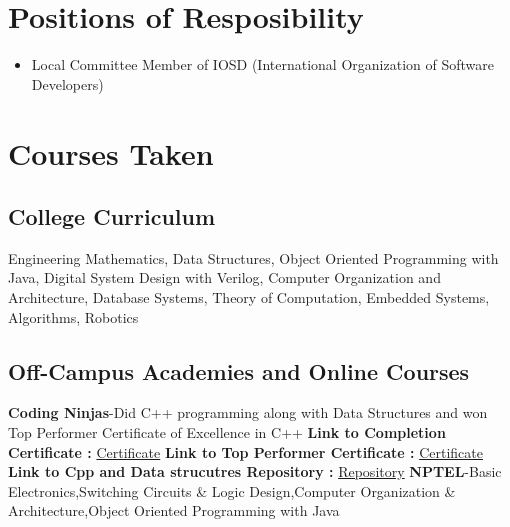 \documentclass[a4paper,12pt]{article}
\begin{document}
\section*{Positions of Resposibility}
\begin{itemize}
    \item Local Committee Member of IOSD
          (International Organization of Software Developers)
\end{itemize}
\pagebreak
\section*{Courses Taken}
\subsection*{College Curriculum}
Engineering Mathematics,
Data Structures,
Object Oriented Programming with Java,
Digital System Design with Verilog,
Computer Organization and Architecture,
Database Systems,
Theory of Computation,
Embedded Systems,
Algorithms,
Robotics
\subsection*{Off-Campus Academies and Online Courses}
\textbf{Coding Ninjas}-Did C++ programming along with Data Structures
and won Top Performer Certificate of Excellence in C++
\newline
\textbf{Link to Completion Certificate :} \href{https://github.com/teetangh/Kaustav-All-Certifications/blob/master/Programming/Coding%20Ninjas/Coding%20Ninjas%20Cpp%20Completion%20Certificate.pdf}{Certificate}
\newline
\textbf{Link to Top Performer Certificate :} \href{https://github.com/teetangh/Kaustav-All-Certifications/blob/master/Programming/Coding%20Ninjas/Coding%20Ninjas%20Cpp%20Top%20Performer%20Certificate.pdf}{Certificate}
\newline
\textbf{Link to Cpp and Data strucutres Repository :} \href{https://github.com/teetangh/Kaustav-Competitive-Coding}{Repository}
\newline
\textbf{NPTEL}-Basic Electronics,Switching Circuits \& Logic Design,Computer Organization \& Architecture,Object Oriented Programming with Java
\end{document}
